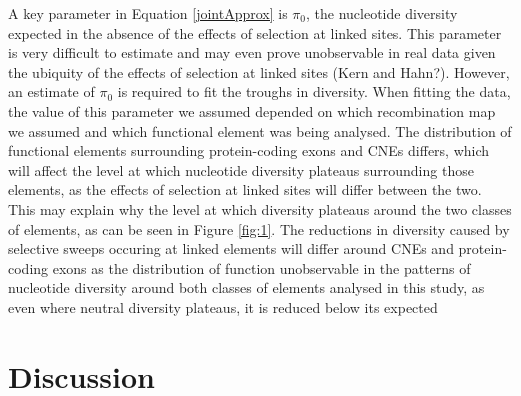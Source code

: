\documentclass[11pt]{article}
\begin{document}
	A key parameter in Equation \ref{jointApprox} is $\pi_0$, the nucleotide diversity expected in the absence of the effects of selection at linked sites. This parameter is very difficult to estimate and may even prove unobservable in real data given the ubiquity of the effects of selection at linked sites (Kern and Hahn?). However, an estimate of $\pi_0$ is required to fit the troughs in diversity. When fitting the data, the value of this parameter we assumed depended on which recombination map we assumed and which functional element was being analysed. The distribution of functional elements surrounding protein-coding exons and CNEs differs, which will affect the level at which nucleotide diversity plateaus surrounding those elements, as the effects of selection at linked sites will differ between the two. This may explain why the level at which diversity plateaus around the two classes of elements, as can be seen in Figure \ref{fig:1}.
	The reductions in diversity caused by selective sweeps occuring at linked elements will differ around CNEs and protein-coding exons as the distribution of function
	unobservable in the patterns of nucleotide diversity around both classes of elements analysed in this study, as even where neutral diversity plateaus, it is reduced below its expected 





%
%

\section*{Discussion}
\end{document}
